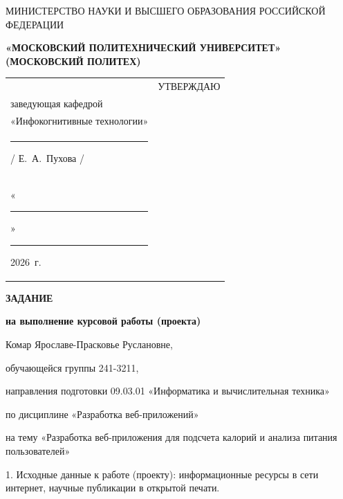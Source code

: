 \documentclass[14pt, a4paper]{extarticle}
\begin{document}
\pagestyle{empty}


\begin{center}
    {\small МИНИСТЕРСТВО НАУКИ И ВЫСШЕГО ОБРАЗОВАНИЯ РОССИЙСКОЙ ФЕДЕРАЦИИ}


    {\small \textbf{«МОСКОВСКИЙ ПОЛИТЕХНИЧЕСКИЙ УНИВЕРСИТЕТ»}} \\
    {\small \textbf{(МОСКОВСКИЙ ПОЛИТЕХ)}}
\end{center}

\begin{tabularx}{\textwidth}{@{} p{} p{} @{}}
     &
    \raggedright
    УТВЕРЖДАЮ                          \\
    заведующая кафедрой                \\
    «Инфокогнитивные технологии»       \\[0.3cm]

    \rule{3cm}{0.4pt} / Е.~А.~Пухова / \\[0.1cm]

    «\rule{0.8cm}{0.4pt}» \rule{3cm}{0.4pt} 2026~г.
\end{tabularx}


\begin{center}

    { \large \textbf{ЗАДАНИЕ}}

    \textbf{на выполнение курсовой работы (проекта)}

    Комар Ярославе-Прасковье Руслановне, %

\end{center}

обучающейся группы 241-3211,

направления подготовки 09.03.01 «Информатика и вычислительная техника»

по дисциплине «Разработка веб-приложений»

на тему «Разработка веб-приложения для подсчета калорий и анализа питания пользователей»

1. Исходные данные к работе (проекту): информационные ресурсы в сети
интернет, научные публикации в открытой печати.
\end{document}
